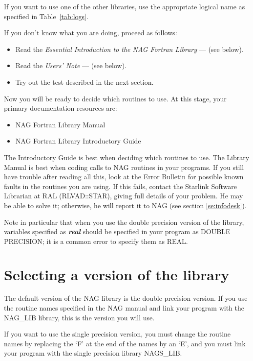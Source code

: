If you want to use one of the other libraries, use the appropriate logical
name as specified in Table~\ref{tab:logs}.

If you don't know what you are doing, proceed as follows:
\begin{itemize}
\item Read the {\em Essential Introduction to the NAG Fortran Library} --- (see
 below).
\item Read the {\em Users' Note} --- (see below).
\item Try out the test described in the next section.
\end{itemize}

Now you will be ready to decide which routines to use. At this stage, your
primary documentation resources are:

\begin{itemize}
\item NAG Fortran Library Manual
\item NAG Fortran Library Introductory Guide
\end{itemize}

The Introductory Guide is best when deciding which routines to use. The Library
Manual is best when coding calls to NAG routines in your programs. If you still
have trouble after reading all this, look at the Error Bulletin for possible
known faults in the routines you are using. If this fails, contact the Starlink
Software Librarian at RAL (RLVAD::STAR), giving full details of your problem.
He may be able to solve it; otherwise, he will report it to NAG (see section
\ref{se:infodesk}).

Note in particular that when you use the double precision version of the
library, variables specified as {\em\bf real} should be specified in your
program as DOUBLE PRECISION; it is a common error to specify them as REAL.

\section{Selecting a version of the library}

The default version of the NAG library is the double precision version.
If you use the routine names specified in the NAG manual and link your program
with the NAG\_LIB library, this is the version you will use.

If you want to use the single precision version, you must change the routine
names by replacing the `F' at the end of the names by an `E', and
you must link your program with the single precision library NAGS\_LIB.

